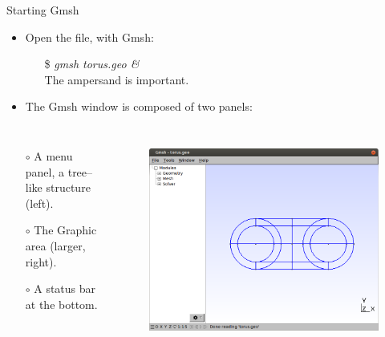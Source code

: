 \documentclass[t]{beamer}
\begin{document}
\begin{frame}{Starting Gmsh}
  \begin{itemize} 
     \item Open the file, with Gmsh:
     \begin{itemize} 
         \item[\$] \emph{gmsh torus.geo \&} \\ \hspace{10pt} The ampersand is important.
     \end{itemize} 
     \item The Gmsh window is composed of two panels:
  \end{itemize}
\vspace{-15pt}
\begin{columns}[l]
\column{2.3in}
  \begin{itemize} 
        \item[$\circ$] A menu panel, a tree--like structure (left).
        \item[$\circ$] The Graphic area (larger, right).
        \item[$\circ$] A status bar at the bottom.
  \end{itemize}
\column{2.2in}
\vspace{-5pt}
\begin{figure}[htbp!]
 \centering
  \includegraphics[width=1.0\textwidth]{figures/torus_z_view}
  \label{fig:torus_z_view}
\end{figure}
\end{columns}
\end{frame}
\end{document}
